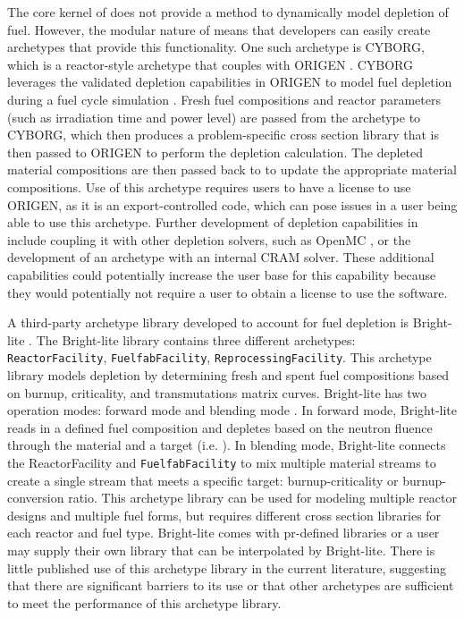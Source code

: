 The core kernel of \Cyclus does not provide a method to dynamically 
model depletion of fuel. However, the modular nature of \Cyclus means 
that developers can easily create archetypes that provide this 
functionality. One such archetype is \gls{CYBORG}, which is a 
reactor-style archetype that couples \Cyclus with ORIGEN 
\cite{skutnik_cyborg_2016}. \gls{CYBORG} leverages the validated 
depletion capabilities in ORIGEN to model fuel depletion during 
a fuel cycle simulation \cite{skutnik_cyborg_2016}. Fresh fuel  
compositions and reactor parameters (such as irradiation time and 
power level) are passed from the archetype to \gls{CYBORG}, which then 
produces a problem-specific cross section library that is then passed to 
ORIGEN to perform the depletion calculation. The depleted material 
compositions are then passed back to \Cyclus to update the 
appropriate material compositions. Use of this 
archetype requires users to have a license to use ORIGEN, as it 
is an export-controlled code, which can pose issues in a user being 
able to use this archetype. Further development of depletion 
capabilities in \Cyclus include coupling it with other 
depletion solvers, such as OpenMC \cite{romano_depletion_2021}, 
or the development of an archetype with an internal CRAM solver. 
These additional capabilities could potentially increase the user base 
for this capability because they would potentially not require a user 
to obtain a license to use the software. 

A third-party archetype library developed to account for fuel depletion 
is Bright-lite \cite{schneider_integrated_2016}. The Bright-lite 
library contains three different archetypes: \texttt{ReactorFacility}, 
\texttt{FuelfabFacility}, \texttt{ReprocessingFacility}. This archetype library 
models depletion by determining fresh and spent fuel compositions
based on burnup, criticality, and transmutations matrix curves. 
Bright-lite has two operation modes: forward mode and blending 
mode \cite{schneider_integrated_2016}. In forward mode, Bright-lite 
reads in a defined fuel composition and depletes based on the neutron 
fluence through the material and a target (i.e. ). In 
blending mode, Bright-lite connects the ReactorFacility and 
\texttt{FuelfabFacility} to mix multiple material streams to create a single 
stream that meets a specific target: burnup-criticality or burnup-conversion
ratio. This archetype library can be used for modeling multiple reactor 
designs and multiple fuel forms, but requires different cross 
section libraries for each reactor and fuel type. Bright-lite comes 
with pr-defined libraries or a user may supply their own 
library that can be interpolated by Bright-lite. There is little 
published use of this archetype library in the current literature, 
suggesting that there are significant barriers to its use or that 
other archetypes are sufficient to meet the performance of this 
archetype library. 

